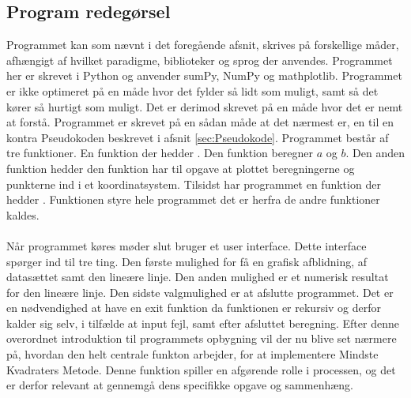\subsection{Program redegørsel}
Programmet kan som nævnt i det foregående afsnit, skrives på forskellige måder, afhængigt af hvilket paradigme, biblioteker og sprog der anvendes. Programmet her er skrevet i Python og anvender sumPy, NumPy og mathplotlib. Programmet er ikke optimeret på en måde hvor det fylder så lidt som muligt, samt så det kører så hurtigt som muligt. Det er derimod skrevet på en måde hvor det er nemt at forstå. Programmet er skrevet på en sådan måde at det nærmest er, en til en kontra Pseudokoden beskrevet i afsnit \ref{sec:Pseudokode}. Programmet består af tre funktioner. En funktion der hedder . Den funktion beregner $a$ og $b$. Den anden funktion hedder  den funktion har til opgave at plottet beregningerne og punkterne ind i et koordinatsystem. Tilsidst har programmet en funktion der hedder . Funktionen  styre hele programmet det er herfra de andre funktioner kaldes.  \\\\ Når programmet køres møder slut bruger et user interface. Dette interface spørger ind til tre ting. Den første mulighed for få en grafisk afblidning, af datasættet samt den lineære linje. Den anden mulighed er et numerisk resultat for den lineære linje. Den sidste valgmulighed er at afslutte programmet. Det er en nødvendighed at have en exit funktion da funktionen  er rekursiv og derfor kalder sig selv, i tilfælde at input fejl, samt efter afsluttet beregning. Efter denne overordnet introduktion til programmets opbygning vil der nu blive set nærmere på, hvordan den helt centrale funkton arbejder, for at implementere Mindste Kvadraters Metode. Denne funktion spiller en afgørende rolle i processen, og det er derfor relevant at gennemgå dens specifikke opgave og sammenhæng. 

